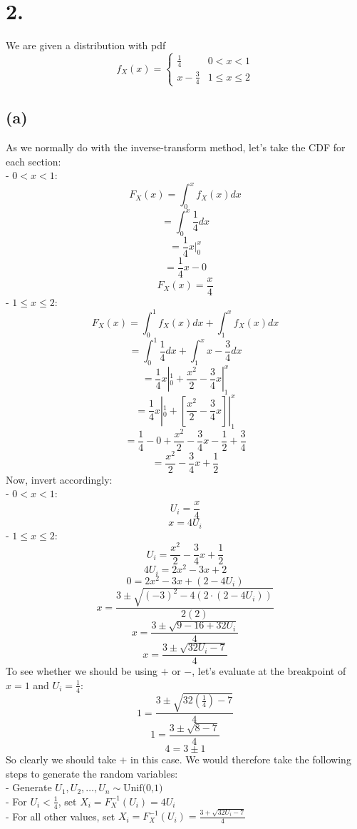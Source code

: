 \documentclass{article}
\begin{document}
{\Large 

\section*{2.}

We are given a distribution with pdf 
\[ 
  f_X(x) = 
  \begin{cases} 
    \frac{1}{4} & 0 < x < 1 \\
    x - \frac{3}{4} & 1 \leq x \leq 2 
  \end{cases} 
\]

\subsection*{(a)} 

As we normally do with the inverse-transform method, let's take the CDF for each section: \\
- \(0 < x < 1\): \\ 
\[
  F_X(x) = \int_0^x f_X(x) dx
\]
\[
  = \int_0^x \frac{1}{4} dx
\]
\[
  = \frac{1}{4}x |_0^x
\]
\[
  = \frac{1}{4}x - 0
\]
\[
  F_X(x) = \frac{x}{4}
\]
- \(1 \leq x \leq 2\): \\
\[
  F_X(x) = \int_0^1 f_X(x) dx + \int_1^x f_X(x) dx
\]
\[
  = \int_0^1 \frac{1}{4} dx + \int_1^x x - \frac{3}{4} dx
\]
\[
  = \frac{1}{4}x |_0^1 + \frac{x^2}{2} - \frac{3}{4}x |_1^x
\]
\[
  = \frac{1}{4}x |_0^1 + [\frac{x^2}{2} - \frac{3}{4}x] |_1^x
\]
\[
  = \frac{1}{4} - 0 + \frac{x^2}{2} - \frac{3}{4}x - \frac{1}{2} + \frac{3}{4}
\]
\[
  = \frac{x^2}{2} - \frac{3}{4}x + \frac{1}{2}
\]
Now, invert accordingly: \\
- \(0 < x < 1\): \\ 
\[
  U_i = \frac{x}{4}
\]
\[
  x = 4U_i
\]
- \(1 \leq x \leq 2\): \\ 
\[
  U_i = \frac{x^2}{2} - \frac{3}{4}x + \frac{1}{2}
\]
\[
  4U_i = 2x^2 - 3x + 2
\]
\[
  0 = 2x^2 - 3x + (2 - 4U_i)
\]
\[
  x = \frac{3 \pm \sqrt{(-3)^2 - 4(2 \cdot (2 - 4U_i))}}{2(2)}
\]
\[
  x = \frac{3 \pm \sqrt{9 - 16 + 32U_i}}{4}
\]
\[
  x = \frac{3 \pm \sqrt{32U_i - 7}}{4}
\]
To see whether we should be using \(+\) or \(-\), let's evaluate at the breakpoint of \(x=1\) and \(U_i = \frac{1}{4}\):
\[
  1 = \frac{3 \pm \sqrt{32(\frac{1}{4})- 7}}{4}
\]
\[
  1 = \frac{3 \pm \sqrt{8- 7}}{4}
\]
\[
  4 = 3 \pm 1
\]
So clearly we should take \(+\) in this case. We would therefore take the following steps to generate the random variables: \\
- Generate \(U_1, U_2, \dots, U_n \sim \text{Unif(0,1)}\) \\ 
- For \(U_i < \frac{1}{4}\), set \(X_i = F^{-1}_X(U_i) = 4U_i\) \\
- For all other values, set \(X_i = F^{-1}_X(U_i) = \frac{3 + \sqrt{32U_i - 7}}{4}\)

}
\end{document}
